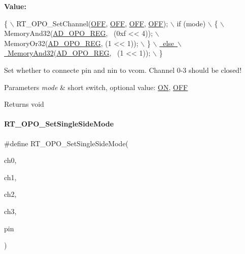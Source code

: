 {\bfseries Value\+:}
\begin{DoxyCode}
\{                                             \(\backslash\)
        RT\_OPO\_SetChannel(\mbox{\hyperlink{a00020_a29e413f6725b2ba32d165ffaa35b01e5}{OFF}}, \mbox{\hyperlink{a00020_a29e413f6725b2ba32d165ffaa35b01e5}{OFF}}, \mbox{\hyperlink{a00020_a29e413f6725b2ba32d165ffaa35b01e5}{OFF}}, \mbox{\hyperlink{a00020_a29e413f6725b2ba32d165ffaa35b01e5}{OFF}});    \(\backslash\)
        if (mode)                                 \(\backslash\)
        \{                                         \(\backslash\)
            MemoryAnd32(\mbox{\hyperlink{a00020_aeca2931f15b40d772a94a66e4641619e}{AD\_OPO\_REG}}, ~(0xf << 4)); \(\backslash\)
            MemoryOr32(\mbox{\hyperlink{a00020_aeca2931f15b40d772a94a66e4641619e}{AD\_OPO\_REG}}, (1 << 1));     \(\backslash\)
        \}                                         \mbox{\hyperlink{a00020_ad87cedffcaadc51db22594fce55173d4}{\(\backslash\)}}
\mbox{\hyperlink{a00020_ad87cedffcaadc51db22594fce55173d4}{        else                                      \(\backslash\)}}
\mbox{\hyperlink{a00020_ad87cedffcaadc51db22594fce55173d4}{            MemoryAnd32}}(\mbox{\hyperlink{a00020_aeca2931f15b40d772a94a66e4641619e}{AD\_OPO\_REG}}, ~(1 << 1));   \(\backslash\)
    \}
\end{DoxyCode}


Set whether to connecte pin and nin to vcom. Channel 0-\/3 should be closed! 


\begin{DoxyParams}{Parameters}
{\em mode} & short switch, optional value\+: \mbox{\hyperlink{a00020_ad76d1750a6cdeebd506bfcd6752554d2}{ON}}, \mbox{\hyperlink{a00020_a29e413f6725b2ba32d165ffaa35b01e5}{O\+FF}} \\
\hline
\end{DoxyParams}
\begin{DoxyReturn}{Returns}
void 
\end{DoxyReturn}
\mbox{\label{a00002_a6438defc0d6280f2b5baedc039f2e314}} 
\paragraph{\texorpdfstring{R\+T\+\_\+\+O\+P\+O\+\_\+\+Set\+Single\+Side\+Mode}{RT\_OPO\_SetSingleSideMode}}
{\footnotesize\ttfamily \#define R\+T\+\_\+\+O\+P\+O\+\_\+\+Set\+Single\+Side\+Mode(\begin{DoxyParamCaption}\item[{}]{ch0,  }\item[{}]{ch1,  }\item[{}]{ch2,  }\item[{}]{ch3,  }\item[{}]{pin }\end{DoxyParamCaption})}


